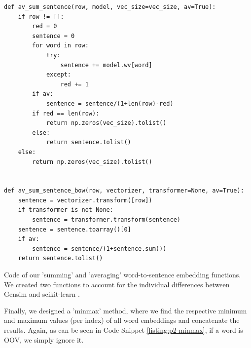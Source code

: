 \begin{listing*}
\begin{verbatim}
def av_sum_sentence(row, model, vec_size=vec_size, av=True):
    if row != []:
        red = 0
        sentence = 0
        for word in row:
            try:
                sentence += model.wv[word]
            except:
                red += 1
        if av:
            sentence = sentence/(1+len(row)-red)
        if red == len(row):
            return np.zeros(vec_size).tolist()
        else:
            return sentence.tolist()
    else:
        return np.zeros(vec_size).tolist()


def av_sum_sentence_bow(row, vectorizer, transformer=None, av=True):
    sentence = vectorizer.transform([row])
    if transformer is not None:
        sentence = transformer.transform(sentence)
    sentence = sentence.toarray()[0]
    if av:
        sentence = sentence/(1+sentence.sum())
    return sentence.tolist()
\end{verbatim}
\caption{Code of our 'summing' and 'averaging' word-to-sentence embedding functions. We created two functions to account for the individual differences between Gensim \cite{gensim} and scikit-learn \cite{sklearn1, sklearn2}.}
\label{listing:p2-sumav}
\end{listing*}

Finally, we designed a 'minmax' method, where we find the respective minimum and maximum values (per index) of all word embeddings and concatenate the results. Again, as can be seen in Code Snippet \ref{listing:p2-minmax}, if a word is OOV, we simply ignore it.


